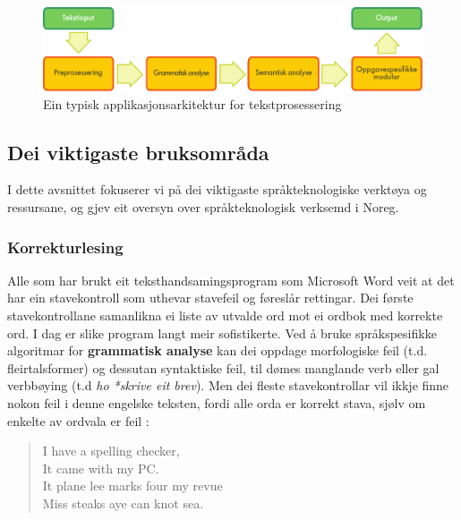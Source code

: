 \begin{multicols}{2}
\begin{figure}[htb]
  \center
  \includegraphics[width=\textwidth]{../_media/norwegian-nynorsk/text_processing_app_architecture}
  \caption{Ein typisk applikasjonsarkitektur for tekstprosessering}
  \label{fig:textprocessingarch_no}
\end{figure}

\subsection{Dei viktigaste bruksområda}

I dette avsnittet fokuserer vi på dei viktigaste språkteknologiske verktøya og ressursane, og gjev eit oversyn over språkteknologisk verksemd i Noreg.  %

\subsubsection{Korrekturlesing}

Alle som har brukt eit teksthandsamingsprogram som Microsoft Word veit at det har ein stavekontroll som uthevar stavefeil og føreslår rettingar. Dei første stavekontrollane samanlikna ei liste av utvalde ord mot ei ordbok med korrekte ord. I dag er slike program langt meir sofistikerte. Ved å bruke språkspesifikke algoritmar for \textbf{grammatisk analyse} kan dei oppdage morfologiske feil (t.d. fleirtalsformer) og dessutan syntaktiske feil, til dømes manglande verb eller gal verbbøying (t.d \textit{ho *skrive eit brev}). Men dei fleste stavekontrollar vil ikkje finne nokon feil i denne engelske teksten, fordi alle orda er korrekt stava, sjølv om enkelte av ordvala er feil \cite{zar1}:
 
\begin{quote}
  I have a spelling checker,\\
  It came with my PC.\\
  It plane lee marks four my revue\\
  Miss steaks aye can knot sea.
\end{quote}


\end{multicols}
